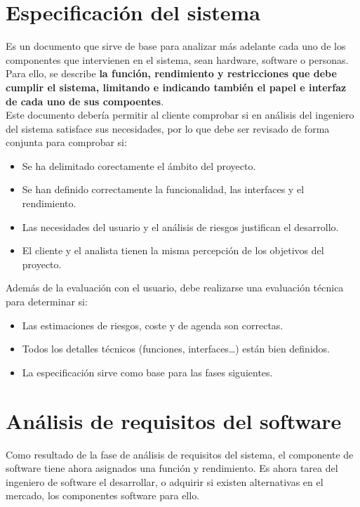 \section{Especificación del sistema}

Es un documento que sirve de base para analizar más adelante cada uno de los componentes que intervienen en el sistema, sean hardware, software o personas. Para ello, se describe \textbf{la función, rendimiento y restricciones que debe cumplir el sistema, limitando e indicando también el papel e interfaz de cada uno de sus compoentes}.\\

Este documento debería permitir al cliente comprobar si en análisis del ingeniero del sistema satisface sus necesidades, por lo que debe ser revisado de forma conjunta para comprobar si:

\begin{itemize}
    \item Se ha delimitado corectamente el ámbito del proyecto.
    \item Se han definido correctamente la funcionalidad, las interfaces y el rendimiento.
    \item Las necesidades del usuario y el análisis de riesgos justifican el desarrollo.
    \item El cliente y el analista tienen la misma percepción de los objetivos del proyecto.
\end{itemize}

Además de la evaluación con el usuario, debe realizarse una evaluación técnica para determinar si:

\begin{itemize}
    \item Las estimaciones de riesgos, coste y de agenda son correctas.
    \item Todos los detalles técnicos (funciones, interfaces\ldots) están bien definidos.
    \item La especificación sirve como base para las fases siguientes.
\end{itemize}

\section{Análisis de requisitos del software}

Como resultado de la fase de análisis de requisitos del sistema, el componente de software tiene ahora asignados una función y rendimiento. Es ahora tarea del ingeniero de software el desarrollar, o adquirir si existen alternativas en el mercado, los componentes software para ello.

